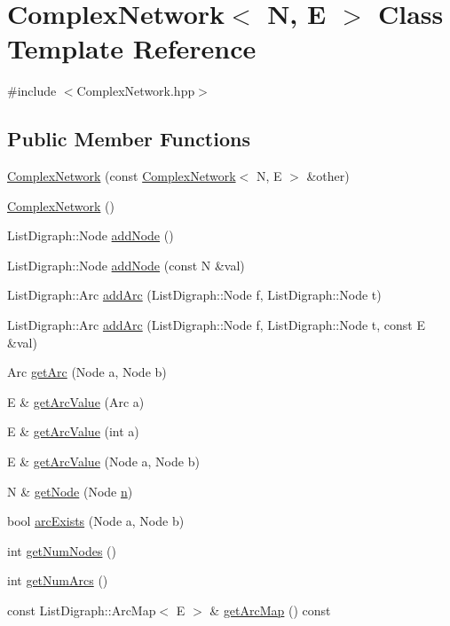 \hypertarget{class_complex_network}{\section{Complex\+Network$<$ N, E $>$ Class Template Reference}
\label{class_complex_network}
}


{\ttfamily \#include $<$Complex\+Network.\+hpp$>$}

\subsection*{Public Member Functions}
\begin{DoxyCompactItemize}
\item 
\hyperlink{class_complex_network_ace07d7064b00b9f358eb98228ff547d2}{Complex\+Network} (const \hyperlink{class_complex_network}{Complex\+Network}$<$ N, E $>$ \&other)
\item 
\hyperlink{class_complex_network_aeaa6515a7b2b14f58391d3ea96f8ba1c}{Complex\+Network} ()
\item 
List\+Digraph\+::\+Node \hyperlink{class_complex_network_a94dc0dc077369f49fcf6010236c6e461}{add\+Node} ()
\item 
List\+Digraph\+::\+Node \hyperlink{class_complex_network_add76e54a672f7489ec0fc03e720b2040}{add\+Node} (const N \&val)
\item 
List\+Digraph\+::\+Arc \hyperlink{class_complex_network_ad257925d1fe72a1512c43d83a5c02c6c}{add\+Arc} (List\+Digraph\+::\+Node f, List\+Digraph\+::\+Node t)
\item 
List\+Digraph\+::\+Arc \hyperlink{class_complex_network_ac295c2bb486f33b91761f58d727f87ff}{add\+Arc} (List\+Digraph\+::\+Node f, List\+Digraph\+::\+Node t, const E \&val)
\item 
Arc \hyperlink{class_complex_network_a0b8a94ddb234a3be1c8f6395879120ea}{get\+Arc} (Node a, Node b)
\item 
E \& \hyperlink{class_complex_network_acec7daa653363b1a7f7835258eeef198}{get\+Arc\+Value} (Arc a)
\item 
E \& \hyperlink{class_complex_network_a9fcc4be3ca83cd6afb5865bff245321b}{get\+Arc\+Value} (int a)
\item 
E \& \hyperlink{class_complex_network_a2a43744eca534a8b2090ceb11f97be2c}{get\+Arc\+Value} (Node a, Node b)
\item 
N \& \hyperlink{class_complex_network_a2631cf373b8711f9e6ab7fb0636b6f62}{get\+Node} (Node \hyperlink{print_report_8m_aeab71244afb687f16d8c4f5ee9d6ef0e}{n})
\item 
bool \hyperlink{class_complex_network_ac3b0160abb78c53260c9e77dece41b74}{arc\+Exists} (Node a, Node b)
\item 
int \hyperlink{class_complex_network_af82c570ef1bbe0db0751554ed7bec9da}{get\+Num\+Nodes} ()
\item 
int \hyperlink{class_complex_network_aa5810b5e82898b9f7b8ea22d68835bfb}{get\+Num\+Arcs} ()
\item 
const List\+Digraph\+::\+Arc\+Map$<$ E $>$ \& \hyperlink{class_complex_network_a5c67bb0a664e9ffe1607609718f21d16}{get\+Arc\+Map} () const 
\end{DoxyCompactItemize}
